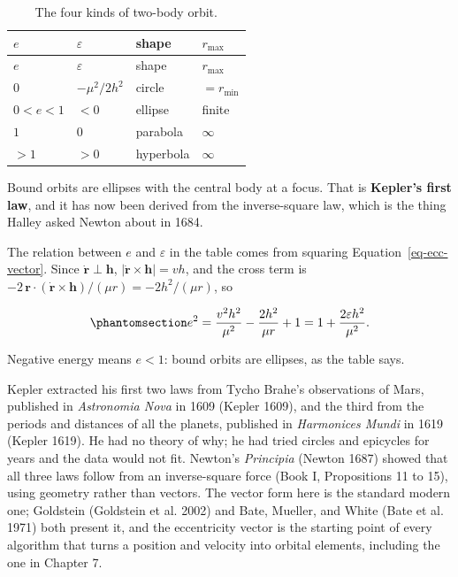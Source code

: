 \documentclass[
  10.5pt,
  letterpaper,
]{scrbook}
\theoremstyle{plain}
\theoremstyle{remark}
\begin{document}
\begin{longtable}[]{@{}llll@{}}
\caption{The four kinds of two-body
orbit.}\label{tbl-conics}\tabularnewline
\toprule\noalign{}
\(e\) & \(\varepsilon\) & shape & \(r_{\max}\) \\
\midrule\noalign{}
\endfirsthead
\toprule\noalign{}
\(e\) & \(\varepsilon\) & shape & \(r_{\max}\) \\
\midrule\noalign{}
\endhead
\bottomrule\noalign{}
\endlastfoot
\(0\) & \(-\mu^2/2h^2\) & circle & \(= r_{\min}\) \\
\(0 < e < 1\) & \(< 0\) & ellipse & finite \\
\(1\) & \(0\) & parabola & \(\infty\) \\
\(> 1\) & \(> 0\) & hyperbola & \(\infty\) \\
\end{longtable}

Bound orbits are ellipses with the central body at a focus. That is
\textbf{Kepler's first law}, and it has now been derived from the
inverse-square law, which is the thing Halley asked Newton about in
1684.

The relation between \(e\) and \(\varepsilon\) in the table comes from
squaring Equation~\ref{eq-ecc-vector}. Since
\(\dot{\mathbf{r}} \perp \mathbf{h}\),
\(|\dot{\mathbf{r}}\times\mathbf{h}| = vh\), and the cross term is
\(-2\,\mathbf{r}\cdot(\dot{\mathbf{r}}\times\mathbf{h})/(\mu r) = -2h^2/(\mu r)\),
so

\begin{equation}\protect\phantomsection\label{eq-e-energy}{
e^2 = \frac{v^2 h^2}{\mu^2} - \frac{2h^2}{\mu r} + 1 = 1 + \frac{2\varepsilon h^2}{\mu^2}.
}\end{equation}

Negative energy means \(e<1\): bound orbits are ellipses, as the table
says.

\begin{tcolorbox}[enhanced jigsaw, arc=.35mm, bottomrule=.15mm, bottomtitle=1mm, breakable, colback=white, colbacktitle=quarto-callout-note-color!10!white, colframe=quarto-callout-note-color-frame, coltitle=black, left=2mm, leftrule=.75mm, opacityback=0, opacitybacktitle=0.6, rightrule=.15mm, title={Where it comes from}, titlerule=0mm, toprule=.15mm, toptitle=1mm]

Kepler extracted his first two laws from Tycho Brahe's observations of
Mars, published in \emph{Astronomia Nova} in 1609 (Kepler 1609), and the
third from the periods and distances of all the planets, published in
\emph{Harmonices Mundi} in 1619 (Kepler 1619). He had no theory of why;
he had tried circles and epicycles for years and the data would not fit.
Newton's \emph{Principia} (Newton 1687) showed that all three laws
follow from an inverse-square force (Book I, Propositions 11 to 15),
using geometry rather than vectors. The vector form here is the standard
modern one; Goldstein (Goldstein et al. 2002) and Bate, Mueller, and
White (Bate et al. 1971) both present it, and the eccentricity vector is
the starting point of every algorithm that turns a position and velocity
into orbital elements, including the one in Chapter 7.

\end{tcolorbox}
\end{document}
